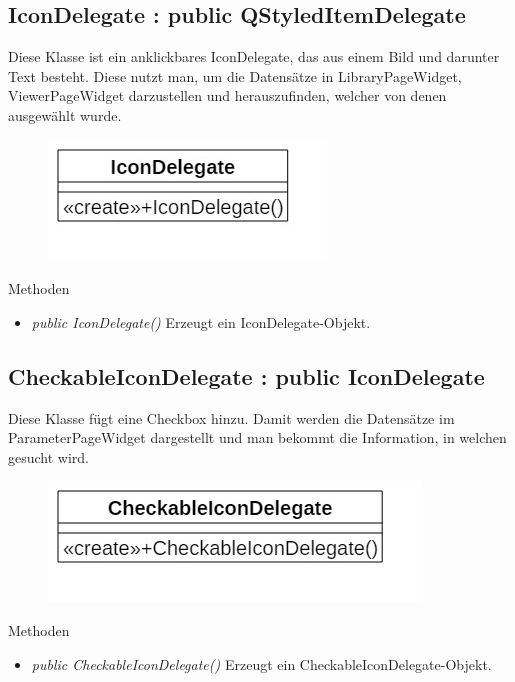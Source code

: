 \subsection*{IconDelegate : public QStyledItemDelegate}
Diese Klasse ist ein anklickbares IconDelegate, das aus einem Bild und darunter Text besteht. Diese nutzt man, um die Datensätze in LibraryPageWidget, ViewerPageWidget darzustellen und herauszufinden, welcher von denen ausgewählt wurde.

\begin{figure}[H]
	\centering
	\includegraphics[scale=0.5]{img/Klassendiagramm/Klassen/View/IconDelegate}
	\label{fig:iconDelegate}
\end{figure}
\pagebreak
Methoden
\begin{itemize}
	\item\textit{public IconDelegate()}
	Erzeugt ein IconDelegate-Objekt.
\end{itemize}

\subsection*{CheckableIconDelegate : public IconDelegate}
Diese Klasse fügt eine Checkbox hinzu. Damit werden die Datensätze im ParameterPageWidget dargestellt und man bekommt die Information, in welchen gesucht wird.

\begin{figure}[H]
	\centering
	\includegraphics[scale=0.5]{img/Klassendiagramm/Klassen/View/CheckableIconDelegate}
	\label{fig:checkableIconDelegate}
\end{figure}

Methoden
\begin{itemize}
	\item\textit{public CheckableIconDelegate()}
	Erzeugt ein CheckableIconDelegate-Objekt.
\end{itemize} 

